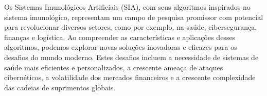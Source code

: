 Os Sistemas Imunológicos Artificiais (SIA), com seus algoritmos inspirados no sistema imunológico, representam um campo de pesquisa promissor com potencial para revolucionar diversos setores, como por exemplo, na saúde, cibersegurança, finanças e logística. Ao compreender as características e aplicações desses algoritmos, podemos explorar novas soluções inovadoras e eficazes para os desafios do mundo moderno. Estes desafios incluem a necessidade de sistemas de saúde mais eficientes e personalizados, a crescente ameaça de ataques cibernéticos, a volatilidade dos mercados financeiros e a crescente complexidade das cadeias de suprimentos globais. 